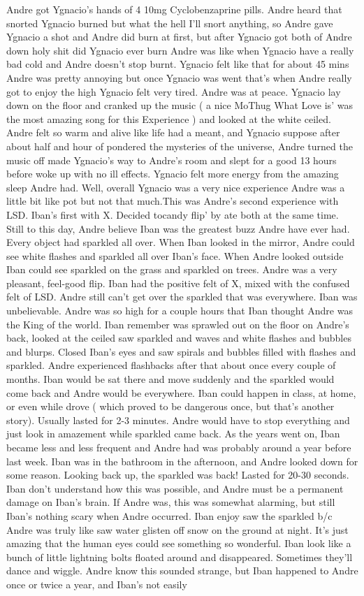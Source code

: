 \documentclass[12pt]{book}
\begin{document}
Andre got Ygnacio's hands of 4 10mg Cyclobenzaprine pills. Andre heard that snorted Ygnacio burned but what the hell I'll snort anything, so Andre gave Ygnacio a shot and Andre did burn at first, but after Ygnacio got both of Andre down holy shit did Ygnacio ever burn Andre was like when Ygnacio have a really bad cold and Andre doesn't stop burnt. Ygnacio felt like that for about 45 mins Andre was pretty annoying but once Ygnacio was went that's when Andre really got to enjoy the high Ygnacio felt very tired. Andre was at peace. Ygnacio lay down on the floor and cranked up the music ( a nice MoThug What Love is' was the most amazing song for this Experience ) and looked at the white ceiled. Andre felt so warm and alive like life had a meant, and Ygnacio suppose after about half and hour of pondered the mysteries of the universe, Andre turned the music off made Ygnacio's way to Andre's room and slept for a good 13 hours before woke up with no ill effects. Ygnacio felt more energy from the amazing sleep Andre had. Well, overall Ygnacio was a very nice experience Andre was a little bit like pot but not that much.This was Andre's second experience with LSD. Iban's first with X. Decided tocandy flip' by ate both at the same time. Still to this day, Andre believe Iban was the greatest buzz Andre have ever had. Every object had sparkled all over. When Iban looked in the mirror, Andre could see white flashes and sparkled all over Iban's face. When Andre looked outside Iban could see sparkled on the grass and sparkled on trees. Andre was a very pleasant, feel-good flip. Iban had the positive felt of X, mixed with the confused felt of LSD. Andre still can't get over the sparkled that was everywhere. Iban was unbelievable. Andre was so high for a couple hours that Iban thought Andre was the King of the world. Iban remember was sprawled out on the floor on Andre's back, looked at the ceiled saw sparkled and waves and white flashes and bubbles and blurps. Closed Iban's eyes and saw spirals and bubbles filled with flashes and sparkled. Andre experienced flashbacks after that about once every couple of months. Iban would be sat there and move suddenly and the sparkled would come back and Andre would be everywhere. Iban could happen in class, at home, or even while drove ( which proved to be dangerous once, but that's another story). Usually lasted for 2-3 minutes. Andre would have to stop everything and just look in amazement while sparkled came back. As the years went on, Iban became less and less frequent and Andre had was probably around a year before last week. Iban was in the bathroom in the afternoon, and Andre looked down for some reason. Looking back up, the sparkled was back! Lasted for 20-30 seconds. Iban don't understand how this was possible, and Andre must be a permanent damage on Iban's brain. If Andre was, this was somewhat alarming, but still Iban's nothing scary when Andre occurred. Iban enjoy saw the sparkled b/c Andre was truly like saw water glisten off snow on the ground at night. It's just amazing that the human eyes could see something so wonderful. Iban look like a bunch of little lightning bolts floated around and disappeared. Sometimes they'll dance and wiggle. Andre know this sounded strange, but Iban happened to Andre once or twice a year, and Iban's not easily 
\end{document}
